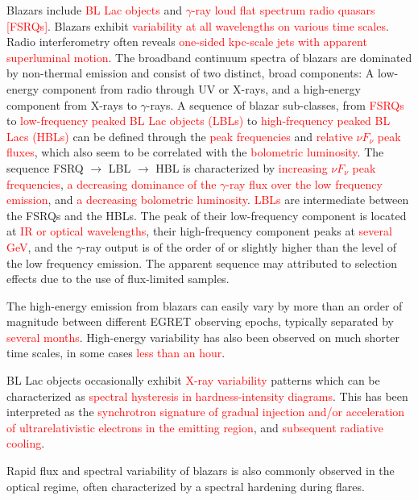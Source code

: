 \documentclass[12pt,a4paper]{article}
\begin{document}
\cite{2007Ap&SS.309...95B} Blazars include \textcolor{red}{BL Lac objects} and \textcolor{red}{$\gamma$-ray loud flat spectrum radio quasars [FSRQs]}. Blazars exhibit \textcolor{red}{variability at all wavelengths on various time scales}. Radio interferometry often reveals \textcolor{red}{one-sided kpc-scale jets with apparent superluminal motion}. The broadband continuum spectra of blazars are dominated by non-thermal emission and consist of two distinct, broad components: A low-energy component from radio through UV or X-rays, and a high-energy component from X-rays to $\gamma$-rays. A sequence of blazar sub-classes, from \textcolor{red}{FSRQs} to \textcolor{red}{low-frequency peaked BL Lac objects (LBLs)} to \textcolor{red}{high-frequency peaked BL Lacs (HBLs)} can be defined through the \textcolor{red}{peak frequencies} and \textcolor{red}{relative $\nu F_\nu$ peak fluxes}, which also seem to be correlated with the \textcolor{red}{bolometric luminosity}.  The sequence FSRQ $\rightarrow$ LBL $\rightarrow$ HBL is characterized by \textcolor{red}{increasing $\nu F_\nu$ peak frequencies}, \textcolor{red}{a decreasing dominance of the $\gamma$-ray flux over the low frequency emission}, and \textcolor{red}{a decreasing bolometric luminosity}. \textcolor{red}{LBLs} are intermediate between the FSRQs and the HBLs. The peak of their low-frequency component is located at \textcolor{red}{IR or optical wavelengths}, their high-frequency component peaks at \textcolor{red}{several GeV}, and the $\gamma$-ray output is of the order of or slightly higher than the level of the low frequency emission. The apparent sequence may attributed to selection effects due to the use of flux-limited samples.

The high-energy emission from blazars can easily vary by more than an order of magnitude between different EGRET observing epochs, typically separated by \textcolor{red}{several months}. High-energy variability has also been observed on much shorter time scales, in some cases \textcolor{red}{less than an hour}. 

BL Lac objects occasionally exhibit \textcolor{red}{X-ray variability} patterns which can be characterized as \textcolor{red}{spectral hysteresis in hardness-intensity diagrams}. This has been interpreted as the \textcolor{red}{synchrotron signature of gradual injection and/or acceleration of ultrarelativistic electrons in the emitting region}, and \textcolor{red}{subsequent radiative cooling}.

Rapid flux and spectral variability of blazars is also commonly observed in the optical regime, often characterized by a spectral hardening during flares.
\end{document}
